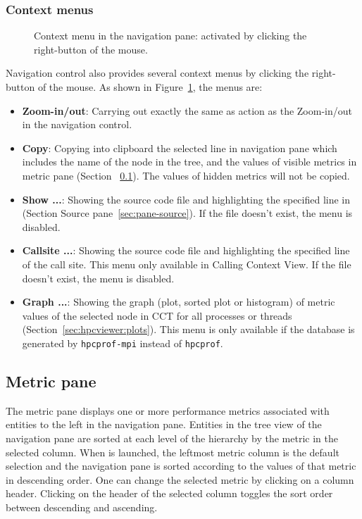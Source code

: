 \subsubsection{Context menus}
\begin{figure}
\caption{Context menu in the navigation pane: activated by clicking the right-button of the mouse.}
\label{fig:hpcviewer-menu-context}
\end{figure}
Navigation control also provides several context menus by clicking the right-button of the mouse. As shown in Figure~\ref{fig:hpcviewer-menu-context}, the menus are:
\begin{itemize}
 \item \textbf{Zoom-in/out}: Carrying out exactly the same as action as the Zoom-in/out in the navigation control.
 \item \textbf{Copy}: Copying into clipboard the selected line in navigation pane which includes the name of the node in the tree, and the values of visible metrics in metric pane (Section ~\ref{sec:pane-metric}). The values of hidden metrics will not be copied.
 \item \textbf{Show ...}: Showing the source code file and highlighting the specified line in (Section Source pane~\ref{sec:pane-source}). If the file doesn't exist, the menu is disabled.
 \item \textbf{Callsite ...}: Showing the source code file and highlighting the specified line of the call site. This menu only available in Calling Context View. If the file doesn't exist, the menu is disabled.
 \item \textbf{Graph ...}: Showing the graph (plot, sorted plot or histogram) of metric values of the selected node in CCT for all processes or threads (Section~\ref{sec:hpcviewer:plots}). This menu is only available if the database is generated by \texttt{hpcprof-mpi} instead of \texttt{hpcprof}. 
\end{itemize}



\subsection{Metric pane}
\label{sec:pane-metric}

The metric pane displays one or more performance metrics associated with entities to the left in the navigation pane.
Entities in the tree view of the navigation pane are sorted at each level of the hierarchy by the metric in the selected column.
When \hpcviewer{} is launched, the leftmost metric column is the default selection and the navigation pane is sorted according to the values of that metric in descending order.
One can change the selected metric by clicking on a column header.
Clicking on the header of the selected column toggles the sort order between descending and ascending.

